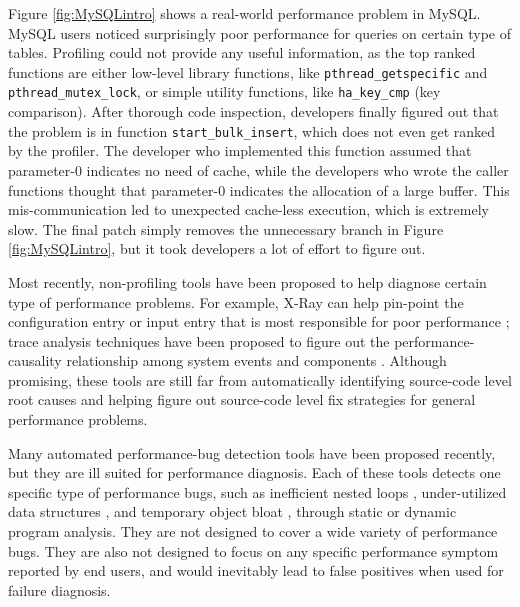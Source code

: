 Figure \ref{fig:MySQLintro}
shows a real-world performance problem in MySQL. MySQL users noticed 
surprisingly poor performance for queries on certain type of tables.
Profiling could not
provide any useful information, as the top ranked
functions are either low-level library functions, like 
\texttt{pthread\_getspecific} and \texttt{pthread\_mutex\_lock}, or simple 
utility
functions, like \texttt{ha\_key\_cmp} (key comparison). 
After thorough code inspection, developers finally figured
out that the problem is in function \texttt{start\_bulk\_insert}, which does
not even get ranked by the profiler.
The developer who implemented this
function assumed that parameter-0 indicates no need of cache, while the 
developers who 
wrote the caller functions thought that parameter-0 indicates the allocation of a
large buffer. This mis-communication led to unexpected cache-less execution, 
which is extremely slow. The final patch simply removes the unnecessary
branch in Figure \ref{fig:MySQLintro}, but it took developers a lot of 
effort to figure out. 

Most recently, non-profiling tools have been proposed to help diagnose certain
type of performance problems. For example, X-Ray can help pin-point the 
configuration entry or input entry that is most responsible for poor 
performance \cite{Attariyan:2012:XAR:2387880.2387910}; trace analysis
techniques have been proposed to figure out the performance-causality 
relationship among system events and components 
\cite{TaoAsplos2014,amertrace}. Although promising, these tools are still
far from automatically identifying
source-code level root causes and helping figure out
source-code level fix
strategies for general performance problems.

Many automated performance-bug detection tools have been proposed recently,
but they are ill suited for performance diagnosis.
Each of these tools detects one specific type of performance bugs,
such as inefficient nested loops \cite{Alabama}, under-utilized data 
structures \cite{Xu:2010:FLD:1806596.1806617}, and temporary object bloat 
\citep{Dufour:2008:STC:1453101.1453111, Xu:2009:GFP:1542476.1542523, Xu:2010:DIC:1806596.1806616},
through 
static or dynamic program analysis. They are not designed to cover a wide variety
of performance bugs. They are also not designed to focus on any specific
performance symptom reported by end users, and would inevitably lead to false 
positives when
used for failure diagnosis.


